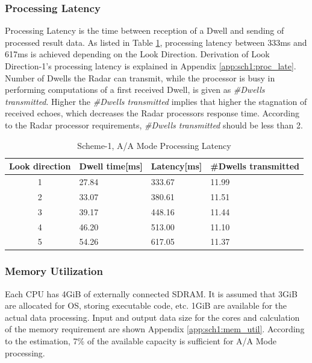 \subsubsection{Processing Latency}
\label{sss:scheme1:latency}
Processing Latency is the time between reception of a Dwell and sending of processed result data. As listed in Table \ref{tbl:existing_analysis:aa_scheme1_latency}, processing latency between 333ms and 617ms is achieved depending on the Look Direction.  Derivation of Look Direction-1's processing latency is explained in Appendix \ref{app:sch1:proc_late}. Number of Dwells the Radar can transmit, while the processor is busy in performing computations of a first received Dwell, is given as \textsl{\#Dwells transmitted}. Higher the \textsl{\#Dwells transmitted} implies that higher the stagnation of received echoes, which decreases the Radar processors response time. According to the Radar processor requirements, \textsl{\#Dwells transmitted} should be less than 2.

\begin{table}[h!]
	\centering
	\begin{tabular}{|c|l|l|l|} 
	 \hline
	 \textbf{Look direction} & \textbf{Dwell time[ms]} & \textbf{Latency[ms]} & \textbf{\#Dwells transmitted} \\
	 \hline
	 1 & 27.84 & 333.67 & 11.99 \\ \hline
	 2 & 33.07 & 380.61 & 11.51 \\ \hline
	 3 & 39.17 & 448.16 & 11.44 \\ \hline
	 4 & 46.20 & 513.00 & 11.10 \\ \hline
	 5 & 54.26 & 617.05 & 11.37 \\ \hline
	\end{tabular}
	\caption{Scheme-1, A/A Mode Processing Latency}
	\label{tbl:existing_analysis:aa_scheme1_latency}
\end{table}

\subsubsection{Memory Utilization}
\label{sec:scheme1:mem_util}
Each CPU has 4GiB of externally connected SDRAM. It is assumed that 3GiB are allocated for OS, storing executable code, etc. 1GiB are available for the actual data processing. Input and output data size for the cores and calculation of the memory requirement are shown Appendix \ref{app:sch1:mem_util}. According to the estimation, 7\% of the available capacity is sufficient for A/A Mode processing.

